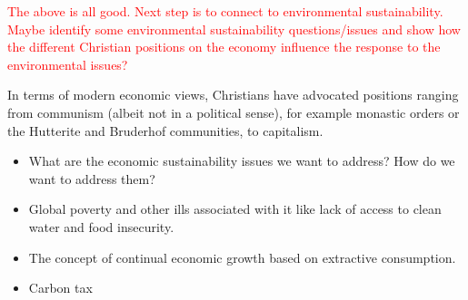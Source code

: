 \documentclass[12pt]{article}
\newcommand{\ins}[1]{\textcolor{red}{#1}}
\begin{document}
\ins{The above is all good. 
Next step is to connect to environmental sustainability.
Maybe identify some environmental sustainability questions/issues
and show how the different Christian positions on the economy
influence the response to the environmental issues?}

In terms of modern economic views, Christians have advocated positions ranging from
communism (albeit not in a political sense), for example monastic orders or the Hutterite
and Bruderhof communities, to capitalism.

\begin{itemize}
\item{What are the economic sustainability issues we want to address? How do we want to address them?}
\item{Global poverty and other ills associated with it like lack of access to clean water and food insecurity.}
\item{The concept of continual economic growth based on extractive consumption.}
\item{Carbon tax}
\end{itemize}
%
%
%

\end{document}
